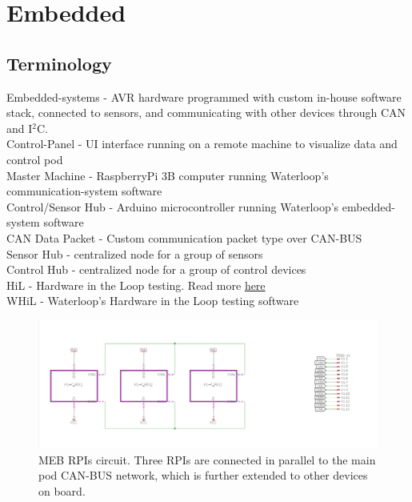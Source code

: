 \documentclass[main.tex]{subfiles}
\begin{document}
    \chapter{Embedded} 
    \label{ch:embedded}
    \section{Terminology}
Embedded-systems - AVR hardware programmed with custom in-house software stack, connected to sensors, and communicating with other devices through CAN and I$^2$C.\\
Control-Panel - UI interface running on a remote machine to visualize data and control pod \\
Master Machine - RaspberryPi 3B computer running Waterloop's communication-system software \\
Control/Sensor Hub - Arduino microcontroller running Waterloop's embedded-system software\\
CAN Data Packet - Custom communication packet type over CAN-BUS \\
Sensor Hub - centralized node for a group of sensors \\
Control Hub - centralized node for a group of control devices \\
HiL - Hardware in the Loop testing. Read more \href{https://en.wikipedia.org/wiki/Hardware-in-the-loop_simulation}{here} \\
WHiL - Waterloop's Hardware in the Loop testing software \\

      \begin{figure}
        \centering
        \includegraphics[width=\textwidth]{images/meb-rpi-mount.png}
        \caption{MEB RPIs circuit. Three RPIs are connected in parallel to the main pod CAN-BUS network, which is further extended to other devices on board.}
        \label{fig:meb-rpi-mount}
    \end{figure}
    
\end{document}
